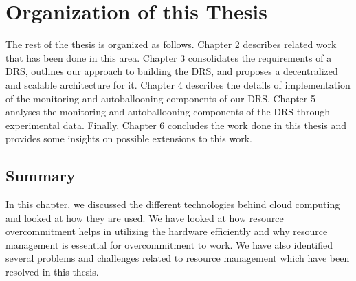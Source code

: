 \section{Organization of this Thesis }
The rest of the thesis is organized as follows. Chapter 2 describes related work that has been done in this area. Chapter 3 consolidates the requirements of a DRS, outlines our approach to building the DRS, and proposes a decentralized and scalable architecture for it. Chapter 4 describes the details of implementation of the monitoring and autoballooning components of our DRS. Chapter 5 analyses the monitoring and autoballooning components of the DRS through experimental data. Finally, Chapter 6 concludes the work done in this thesis and provides some insights on possible extensions to this work.

\subsection*{Summary}
In this chapter, we discussed the different technologies behind cloud computing and looked at how they are used. We have looked at how resource overcommitment helps in utilizing the hardware efficiently and why resource management is essential for overcommitment to work. We have also identified several problems and challenges related to resource management which have been resolved in this thesis.